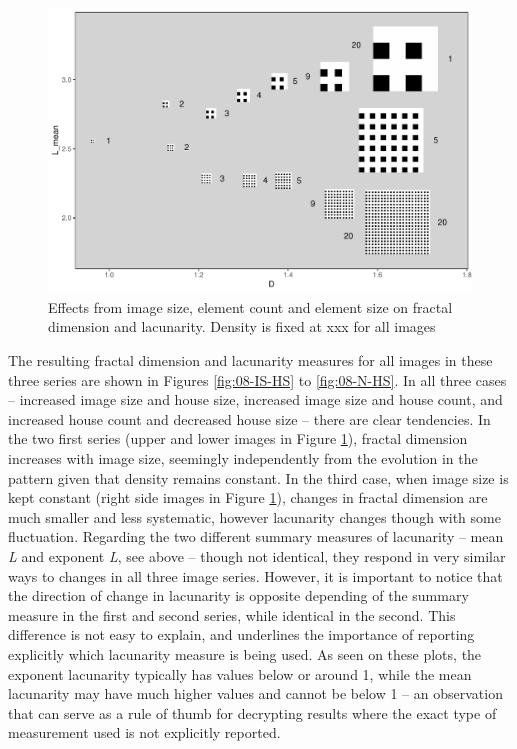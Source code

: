 \documentclass[
  12pt,
]{book}
\begin{document}
\begin{figure}
\hypertarget{fig:08-N-im}{%
\centering
\includegraphics{Results/fig08_N_im.pdf}
\caption{Effects from image size, element count and element size on fractal dimension and lacunarity. Density is fixed at xxx for all images}\label{fig:08-N-im}
}
\end{figure}

The resulting fractal dimension and lacunarity measures for all images in these three series are shown in Figures \ref{fig:08-IS-HS} to \ref{fig:08-N-HS}. In all three cases -- increased image size and house size, increased image size and house count, and increased house count and decreased house size -- there are clear tendencies. In the two first series (upper and lower images in Figure \ref{fig:08-N-im}), fractal dimension increases with image size, seemingly independently from the evolution in the pattern given that density remains constant. In the third case, when image size is kept constant (right side images in Figure \ref{fig:08-N-im}), changes in fractal dimension are much smaller and less systematic, however lacunarity changes though with some fluctuation. Regarding the two different summary measures of lacunarity -- mean \emph{L} and exponent \emph{L}, see above -- though not identical, they respond in very similar ways to changes in all three image series. However, it is important to notice that the direction of change in lacunarity is opposite depending of the summary measure in the first and second series, while identical in the second. This difference is not easy to explain, and underlines the importance of reporting explicitly which lacunarity measure is being used. As seen on these plots, the exponent lacunarity typically has values below or around 1, while the mean lacunarity may have much higher values and cannot be below 1 -- an observation that can serve as a rule of thumb for decrypting results where the exact type of measurement used is not explicitly reported.
\end{document}
